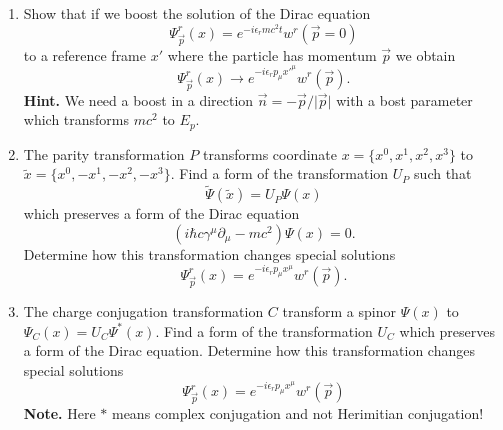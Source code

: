 \documentclass[a4paper,11pt]{article}
\begin{document}
\begin{enumerate}
\item Show that if we boost the solution of the Dirac equation
  \begin{equation}
    \label{QM:08}
    \Psi_{ \vec{ p } }^{ r }( x )
    = e^{ -i \epsilon_{ r } m c^{ 2 } t } w^{ r }( \vec{ p } = 0 )
  \end{equation}
  to a reference frame $x'$ where the particle has momentum
  $\vec{ p }$ we obtain
  \begin{equation}
    \label{QM:09}
    \Psi_{ \vec{ p } }^{ r }( x )
    \to e^{ -i \epsilon_{ r } p_{ \mu } x'^{ \mu } } w^{ r }( \vec{ p } ).
  \end{equation}
  \textbf{Hint.} We need a boost in a direction
  $\vec{ n } = -\vec{ p } / \lvert \vec{ p } \lvert$ with a bost
  parameter which transforms $m c^{ 2 }$ to $E_{ p }$.

\item The parity transformation $P$ transforms coordinate
  $x = \{ x^{ 0 }, x^{ 1 }, x^{ 2 }, x^{ 3 } \}$ to
  $\widetilde{x} = \{ x^{ 0 }, -x^{ 1 }, -x^{ 2 }, -x^{ 3 } \}$. Find
  a form of the transformation $U_{ P }$ such that
  \begin{equation}
    \label{QM:10}
    \widetilde{\Psi}( \widetilde{x} ) = U_{ P } \Psi( x )
  \end{equation}
  which preserves a form of the Dirac equation
  \begin{equation}
    \label{QM:11}
    \left( i \hbar c \gamma^{ \mu } \partial_{ \mu } - m c^{ 2 } \right) \Psi( x ) = 0.
  \end{equation}
  Determine how this transformation changes special solutions
  \begin{equation}
    \label{QM:12}
    \Psi_{ \vec{ p } }^{ r }( x )
    = e^{ -i \epsilon_{ r } p_{ \mu } x^{ \mu } } w^{ r }( \vec{ p } ).
  \end{equation}

\item The charge conjugation transformation $C$ transform a spinor
  $\Psi( x )$ to $\Psi_{ C }( x ) = U_{ C } \Psi^{ * }( x )$. Find a
  form of the transformation $U_{ C }$ which preserves a form of the
  Dirac equation. Determine how this transformation changes special
  solutions
  \begin{equation}
    \label{QM:13}
    \Psi_{ \vec{ p } }^{ r }( x )
    = e^{ -i \epsilon_{ r } p_{ \mu } x^{ \mu } } w^{ r }( \vec{ p } )
  \end{equation}
  \textbf{Note.} Here $*$ means complex conjugation and not Herimitian
  conjugation!


\end{enumerate}
\end{document}
